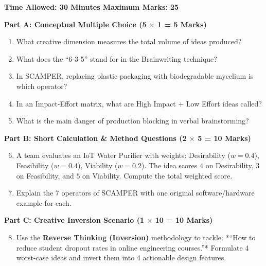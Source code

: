 \begin{chaptertest}
\textbf{Time Allowed: 30 Minutes \hfill Maximum Marks: 25}

\vspace{0.4cm}
\noindent\textbf{Part A: Conceptual Multiple Choice (5 $\times$ 1 = 5 Marks)}
\begin{enumerate}[leftmargin=1.2em, itemsep=2pt]
    \item What creative dimension measures the total volume of ideas produced?
    \item What does the ``6-3-5'' stand for in the Brainwriting technique?
    \item In SCAMPER, replacing plastic packaging with biodegradable mycelium is which operator?
    \item In an Impact-Effort matrix, what are High Impact + Low Effort ideas called?
    \item What is the main danger of production blocking in verbal brainstorming?
\end{enumerate}

\vspace{0.3cm}
\noindent\textbf{Part B: Short Calculation \& Method Questions (2 $\times$ 5 = 10 Marks)}
\begin{enumerate}[leftmargin=1.2em, itemsep=4pt]
    \setcounter{enumi}{5}
    \item A team evaluates an IoT Water Purifier with weights: Desirability ($w=0.4$), Feasibility ($w=0.4$), Viability ($w=0.2$). The idea scores $4$ on Desirability, $3$ on Feasibility, and $5$ on Viability. Compute the total weighted score.
    \item Explain the 7 operators of SCAMPER with one original software/hardware example for each.
\end{enumerate}

\vspace{0.3cm}
\noindent\textbf{Part C: Creative Inversion Scenario (1 $\times$ 10 = 10 Marks)}
\begin{enumerate}[leftmargin=1.2em, itemsep=4pt]
    \setcounter{enumi}{7}
    \item Use the \textbf{Reverse Thinking (Inversion)} methodology to tackle: *``How to reduce student dropout rates in online engineering courses.''* Formulate 4 worst-case ideas and invert them into 4 actionable design features.
\end{enumerate}
\end{chaptertest}

